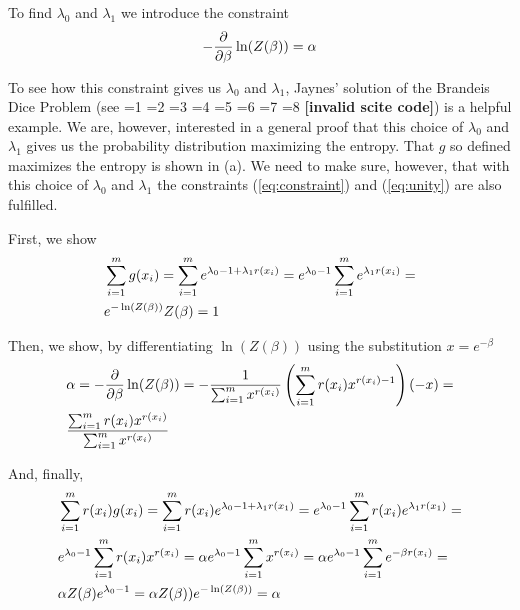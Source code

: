 \documentclass[12pt]{article}
\newif\ifNumericalOrYear
\newcommand{\PageP}{p.~}
\newcommand{\PageP}{}
\newcommand{\scite}[3]{\ifnum#1=1\ifNumericalOrYear\citep{#2}\else\citeyearpar{#2}\fi\else
\ifnum#1=2\ifNumericalOrYear\citep[#3]{#2}\else\citep[{\PageP}#3]{#2}\fi\else
\ifnum#1=3\ifNumericalOrYear(\citet[#3]{#2})\else\citep[{\PageP}#3]{#2}\fi\else
\ifnum#1=4\ifNumericalOrYear\citet{#2}\else\citet{#2}\fi\else
\ifnum#1=5\ifNumericalOrYear(\citet{#2})\else\citep{#2}\fi\else
\ifnum#1=6\ifNumericalOrYear(\citet[#3]{#2})\else\citep[{\PageP}#3]{#2}\fi\else
\ifnum#1=7\ifNumericalOrYear\citep{#2}\else\citealp{#2}\fi\else
\ifnum#1=8\ifNumericalOrYear\citep[#3]{#2}\else\citealp[{\PageP}#3]{#2}\fi\else
\textbf{[invalid scite code]}\fi\fi\fi\fi\fi\fi\fi\fi}
\begin{document}
To find $\lambda_{0}$ and $\lambda_{1}$ we introduce the constraint
\begin{equation}
  \label{eq:logcon}
-\frac{\partial}{\partial{}\beta}\ln(Z(\beta))=\alpha\notag
\end{equation}

To see how this constraint gives us $\lambda_{0}$ and $\lambda_{1}$,
Jaynes' solution of the Brandeis Dice Problem (see
\scite{8}{jaynes89}{243}) is a helpful example. We are, however,
interested in a general proof that this choice of $\lambda_{0}$ and
$\lambda_{1}$ gives us the probability distribution maximizing the
entropy. That $g$ so defined maximizes the entropy is shown in (a). We
need to make sure, however, that with this choice of $\lambda_{0}$ and
$\lambda_{1}$ the constraints ({\ref{eq:constraint}}) and
({\ref{eq:unity}}) are also fulfilled.

First, we show
\begin{align}
&\sum_{i=1}^{m}g(x_{i})=\sum_{i=1}^{m}e^{\lambda_{0}-1+\lambda_{1}r(x_{i})}=e^{\lambda_{0}-1}\sum_{i=1}^{m}e^{\lambda_{1}r(x_{i})}=\notag\\
&e^{-\ln(Z(\beta))}Z(\beta)=1\label{eq:unishow}\notag
\end{align}

Then, we show, by differentiating $\ln(Z(\beta))$ using the
substitution $x=e^{-\beta}$
\begin{align}
&\alpha=-\frac{\partial}{\partial{}\beta}\ln(Z(\beta))=-\frac{1}{\sum_{i=1}^{m}x^{r(x_{i})}}\left(\sum_{i=1}^{m}r(x_{i})x^{r(x_{i})-1}\right)(-x)=\notag\\
&\frac{\sum_{i=1}^{m}r(x_{i})x^{r(x_{i})}}{\sum_{i=1}^{m}x^{r(x_{i})}}\notag
\end{align}

And, finally,
\begin{align}
&\sum_{i=1}^{m}r(x_{i})g(x_{i})=\sum_{i=1}^{m}r(x_{i})e^{\lambda_{0}-1+\lambda_{1}r(x_{1})}=e^{\lambda_{0}-1}\sum_{i=1}^{m}r(x_{i})e^{\lambda_{1}r(x_{1})}=\notag\\
&e^{\lambda_{0}-1}\sum_{i=1}^{m}r(x_{i})x^{r(x_{i})}=\alpha{}e^{\lambda_{0}-1}\sum_{i=1}^{m}x^{r(x_{i})}=\alpha{}e^{\lambda_{0}-1}\sum_{i=1}^{m}e^{-\beta{}r(x_{i})}=\notag\\
&\alpha{}Z(\beta)e^{\lambda_{0}-1}=\alpha{}Z(\beta))e^{-\ln(Z(\beta))}=\alpha\notag
\end{align}
\end{document}
